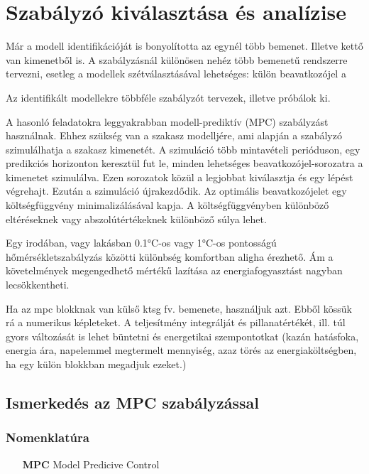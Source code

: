 \chapter{Szabályzó kiválasztása és analízise}

Már a modell identifikációját is bonyolította az egynél több bemenet. Illetve kettő van kimenetből is. A szabályzásnál különösen nehéz több bemenetű rendszerre tervezni, esetleg a modellek szétválasztásával lehetséges: külön beavatkozójel a 


Az identifikált modellekre többféle szabályzót tervezek, illetve próbálok ki.

A hasonló feladatokra leggyakrabban modell-prediktív (MPC) szabályzást használnak\cite{AFRAM2014343}. Ehhez szükség van a szakasz modelljére, ami alapján a szabályzó szimulálhatja a szakasz kimenetét. A szimuláció több mintavételi perióduson, egy predikciós horizonton keresztül fut le, minden lehetséges  beavatkozójel-sorozatra a kimenetet szimulálva. Ezen sorozatok közül a legjobbat kiválasztja és egy lépést végrehajt. Ezután a szimuláció újrakezdődik. Az optimális beavatkozójelet egy költségfüggvény minimalizálásával kapja. A költségfüggvényben különböző eltéréseknek vagy abszolútértékeknek különböző súlya lehet.

Egy irodában, vagy lakásban 0.1\si{\celsius}-os vagy 1\si{\celsius}-os pontosságú hőmérsékletszabályzás közötti különbség komfortban aligha érezhető. Ám a követelmények megengedhető mértékű lazítása az energiafogyasztást nagyban lecsökkentheti.

\begin{formal}
	Ha az mpc blokknak van külső ktsg fv. bemenete, használjuk azt. Ebből kössük rá a numerikus képleteket. A teljesítmény integrálját és pillanatértékét, ill. túl gyors változását is lehet büntetni és energetikai szempontotkat (kazán hatásfoka, energia ára, napelemmel megtermelt mennyiség, azaz törés az energiaköltségben, ha egy külön blokkban megadjuk ezeket.)
\end{formal}

\section{Ismerkedés az MPC szabályzással}

\subsection*{Nomenklatúra}

\begin{itemize}[noitemsep,topsep=-8pt,parsep=0pt,partopsep=0pt,leftmargin=42pt]
	\item[\textbf{MPC}] Model Predicive Control
\end{itemize}

